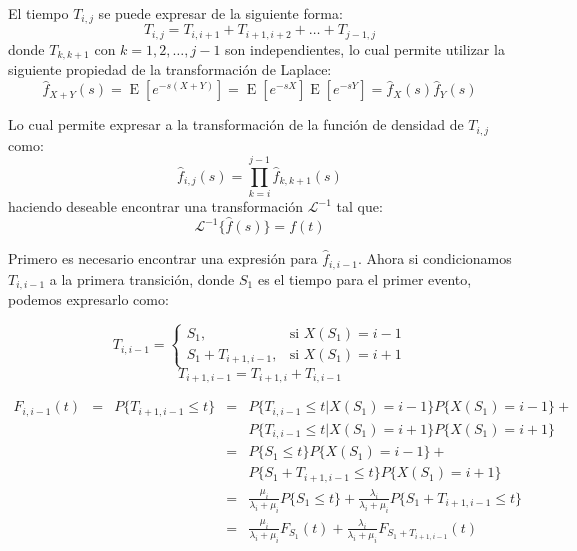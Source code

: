 \documentclass[11pt]{article}
\numberwithin{equation}{section} %
\begin{document}
El tiempo $T_{i,j}$ se puede expresar de la siguiente forma:
\begin{equation}
T_{i,j}=T_{i,i+1}+T_{i+1,i+2}+\ldots+T_{j-1,j}
\end{equation}
donde $T_{k,k+1}$ con $k=1,2,\ldots,j-1$ son independientes, lo cual permite utilizar la siguiente propiedad de la transformación de Laplace:
\begin{equation}
\hat{f}_{X+Y}(s)=\operatorname{E}[e^{-s(X+Y)}]=\operatorname{E}[e^{-sX}]\operatorname{E}[e^{-sY}]=\hat{f}_{X}(s)\hat{f}_{Y}(s)
\end{equation}

Lo cual permite expresar a la transformación de la función de densidad de $T_{i,j}$ como:
\begin{equation}
\hat{f}_{i,j}(s)=\prod_{k=i}^{j-1}\hat{f}_{k,k+1}(s)
\end{equation}
haciendo deseable encontrar una transformación $\mathcal{L}^{-1}$ tal que:
\begin{equation}
\mathcal{L}^{-1}\{\hat{f}(s)\}=f(t)
\end{equation}

Primero es necesario encontrar una expresión para $\hat{f}_{i,i-1}$. Ahora si condicionamos $T_{i,i-1}$ a la primera transición, donde $S_1$ es el tiempo para el primer evento, podemos expresarlo como:

\begin{equation}
T_{i,i-1} =
\begin{cases}
S_{1}, & \mbox{si } X(S_{1})=i-1 \\
S_{1}+T_{i+1,i-1}, & \mbox{si } X(S_{1})=i+1
\end{cases}
\end{equation}
\begin{equation}
T_{i+1,i-1}=T_{i+1,i}+T_{i,i-1}
\end{equation}
 
\[
\begin{array}{rcrcl}
F_{i,i-1}(t) & = & P\{ T_{i+1,i-1}\leq t \} & = & P\{ T_{i,i-1}\leq t | X(S_{1})=i-1 \}P\{ X(S_{1})=i-1 \} +\\
 & & & & P\{ T_{i,i-1}\leq t | X(S_{1})=i+1 \}P\{ X(S_{1})=i+1 \} \\
 & & & = & P\{ S_{1}\leq t\}P\{ X(S_{1})=i-1 \} +\\
 & & & & P\{ S_{1} + T_{i+1,i-1}\leq t\}P\{ X(S_{1})=i+1 \} \\
 & & & = & \frac{\mu_{i}}{\lambda_{i}+\mu_{i}} P\{ S_{1}\leq t\} + \frac{\lambda_{i}}{\lambda_{i}+\mu_{i}} P\{ S_{1} + T_{i+1,i-1}\leq t\}\\
 & & & = & \frac{\mu_{i}}{\lambda_{i}+\mu_{i}} F_{S_{1}}(t) + \frac{\lambda_{i}}{\lambda_{i}+\mu_{i}} F_{ S_{1} + T_{i+1,i-1}}(t)\\
\end{array}
\]
 
\end{document}
